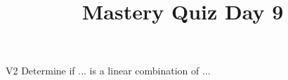 \documentclass{sbgLAquiz}
\title{Mastery Quiz Day 9 }
\begin{document}
\begin{problem}{V2}
Determine if ... is a linear combination of ...
\end{problem}
\end{document}
